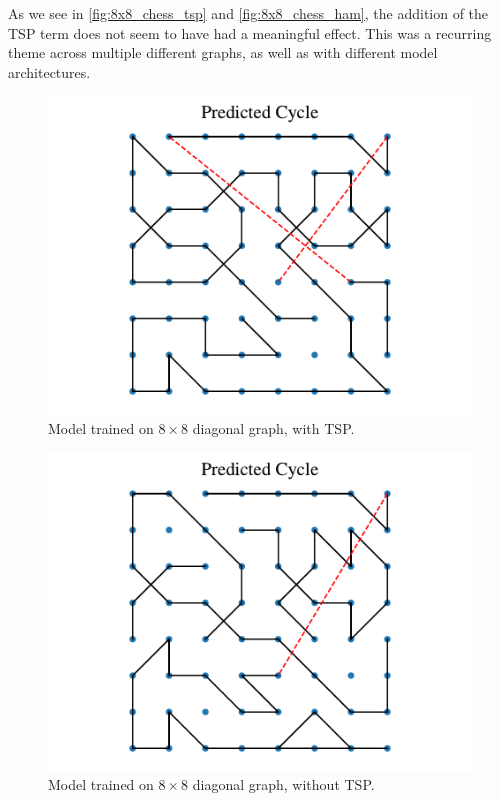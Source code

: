 As we see in \autoref{fig:8x8_chess_tsp} and \autoref{fig:8x8_chess_ham}, the addition of the TSP term does not seem to have had a meaningful effect.
This was a recurring theme across multiple different graphs, as well as with different model architectures.

\begin{figure}[h]
    \centering
    \includegraphics[width=\linewidth]{Project2TSP/_src/figures/tsp_8_chess_tsp.pdf}
    \caption{Model trained on $8 \times 8$ diagonal graph, with TSP.}
    \label{fig:8x8_chess_tsp}
\end{figure}

\begin{figure}[h]
    \centering
    \includegraphics[width=\linewidth]{Project2TSP/_src/figures/tsp_8_chess_ham.pdf}
    \caption{Model trained on $8 \times 8$ diagonal graph, without TSP.}
    \label{fig:8x8_chess_ham}
\end{figure}

